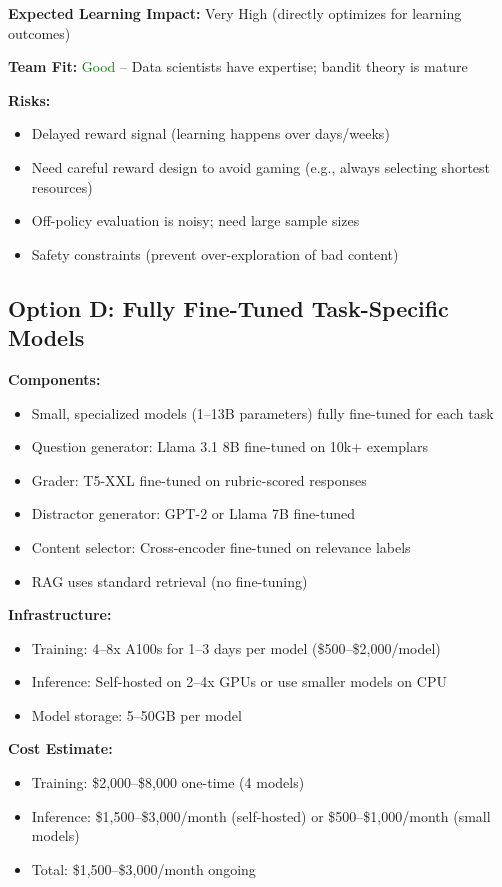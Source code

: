 \documentclass[11pt,letterpaper]{article}
\begin{document}
\textbf{Expected Learning Impact:} Very High (directly optimizes for learning outcomes)

\textbf{Team Fit:} \textcolor{green}{Good} -- Data scientists have expertise; bandit theory is mature

\textbf{Risks:}
\begin{itemize}
\item Delayed reward signal (learning happens over days/weeks)
\item Need careful reward design to avoid gaming (e.g., always selecting shortest resources)
\item Off-policy evaluation is noisy; need large sample sizes
\item Safety constraints (prevent over-exploration of bad content)
\end{itemize}

\subsection{Option D: Fully Fine-Tuned Task-Specific Models}

\textbf{Components:}
\begin{itemize}
\item Small, specialized models (1--13B parameters) fully fine-tuned for each task
\item Question generator: Llama 3.1 8B fine-tuned on 10k+ exemplars
\item Grader: T5-XXL fine-tuned on rubric-scored responses
\item Distractor generator: GPT-2 or Llama 7B fine-tuned
\item Content selector: Cross-encoder fine-tuned on relevance labels
\item RAG uses standard retrieval (no fine-tuning)
\end{itemize}

\textbf{Infrastructure:}
\begin{itemize}
\item Training: 4--8x A100s for 1--3 days per model (\$500--\$2,000/model)
\item Inference: Self-hosted on 2--4x GPUs or use smaller models on CPU
\item Model storage: 5--50GB per model
\end{itemize}

\textbf{Cost Estimate:}
\begin{itemize}
\item Training: \$2,000--\$8,000 one-time (4 models)
\item Inference: \$1,500--\$3,000/month (self-hosted) or \$500--\$1,000/month (small models)
\item Total: \$1,500--\$3,000/month ongoing
\end{itemize}
\end{document}
